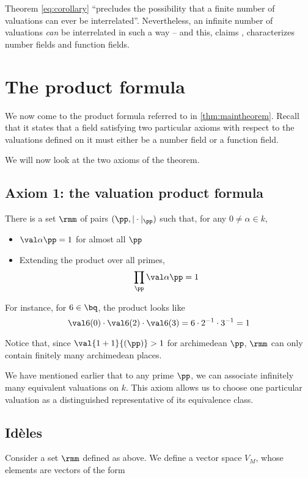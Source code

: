 Theorem \ref{eq:corollary} ``precludes the possibility that a finite number of
valuations can ever be interrelated''. Nevertheless, an infinite number of
valuations \textit{can} be interrelated in such a way -- and this, claims
\cite{artinwhaples}, characterizes number fields and function fields.

\section{The product formula}
\label{sec:productformula}

We now come to the product formula referred to in \ref{thm:maintheorem}. Recall
that it states that a field satisfying two particular axioms with respect to the
valuations defined on it must either be a number field or a function field.

We will now look at the two axioms of the theorem.

\subsection{Axiom 1: the valuation product formula}
\label{sub:axiom1}
\begin{axiom}
  \label{eq:axiom1}
  There is a set $\rmm$ of pairs $(\pp, |\cdot|_\pp)$ such that, for any $0\neq
  \alpha \in k$,
  \begin{itemize}
  \item $\val\alpha\pp = 1$ for almost all $\pp$
  \item Extending the product over all primes,
    \[ \prod_\pp \val\alpha\pp = 1 \]
  \end{itemize}
  For instance, for $6\in\bq$, the product looks like
  \[ \val6{(0)} \cdot\val6{(2)}\cdot\val6{(3)} = 6\cdot 2^{-1} \cdot 3^{-1} =
    1 \]
\end{axiom}
Notice that, since $\val{1+1}{(\pp)} > 1$ for archimedean $\pp$, $\rmm$ can only
contain finitely many archimedean places.

We have mentioned earlier that to any prime $\pp$, we can associate infinitely
many equivalent valuations on $k$. This axiom allows us to choose one particular
valuation as a distinguished representative of its equivalence class.

\subsection{Id\`eles}
\label{sec:orgheadline19}
Consider a set $\rmm$ defined as above. We define a vector space $V_M$, whose
elements are vectors of the form

